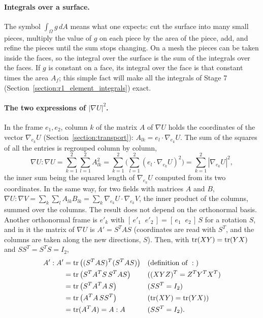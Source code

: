 \paragraph{Integrals over a surface.} The symbol $\int_\Omega g\, dA$ means what one expects: cut the surface into many small pieces, multiply the value of $g$ on each piece by the area of the piece, add, and refine the pieces until the sum stops changing. On a mesh the pieces can be taken inside the faces, so the integral over the surface is the sum of the integrals over the faces. If $g$ is constant on a face, its integral over the face is that constant times the area $A_f$; this simple fact will make all the integrals of Stage 7 (Section~\ref{section:r1_element_integrals}) exact.

\paragraph{The two expressions of $|\nabla U|^2$.} In the frame $e_1, e_2$, column $k$ of the matrix $A$ of $\nabla U$ holds the coordinates of the vector $\nabla_{e_k} U$ (Section~\ref{section:transport}): $A_{lk} = e_l\cdot\nabla_{e_k} U$. The sum of the squares of all the entries is regrouped column by column,
\begin{equation*}
\nabla U : \nabla U = \sum_{k=1}^2 \sum_{l=1}^2 A_{lk}^2 = \sum_{k=1}^2 \Big( \sum_{l=1}^2 (e_l\cdot\nabla_{e_k} U)^2 \Big) = \sum_{k=1}^2 |\nabla_{e_k} U|^2 ,
\end{equation*}
the inner sum being the squared length of $\nabla_{e_k} U$ computed from its two coordinates. In the same way, for two fields with matrices $A$ and $B$, $\nabla U : \nabla V = \sum_k\sum_l A_{lk}B_{lk} = \sum_k \nabla_{e_k} U\cdot \nabla_{e_k} V$, the inner product of the columns, summed over the columns. The result does not depend on the orthonormal basis. Another orthonormal frame is $e'_k$ with $[\,e'_1\;\;e'_2\,] = [\,e_1\;\;e_2\,]\, S$ for a rotation $S$, and in it the matrix of $\nabla U$ is $A' = S^T A S$ (coordinates are read with $S^T$, and the columns are taken along the new directions, $S$). Then, with $\operatorname{tr}(XY) = \operatorname{tr}(YX)$ and $S S^T = S^T S = I_2$,
\begin{align*}
A' : A' &= \operatorname{tr}\big( (S^TAS)^T (S^TAS) \big) && \text{(definition of } : \text{)} \\
&= \operatorname{tr}\big( S^T A^T S\, S^T A S \big) && ((XYZ)^T = Z^TY^TX^T) \\
&= \operatorname{tr}\big( S^T A^T A\, S \big) && (S S^T = I_2) \\
&= \operatorname{tr}\big( A^T A\, S S^T \big) && (\operatorname{tr}(XY) = \operatorname{tr}(YX)) \\
&= \operatorname{tr}(A^TA) = A : A && (S S^T = I_2).
\end{align*}

